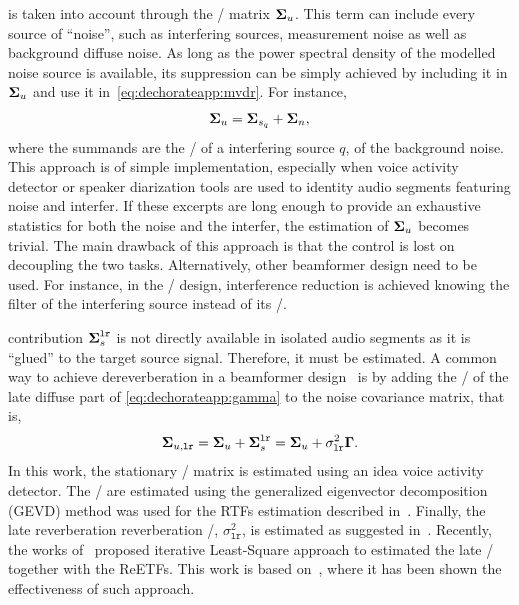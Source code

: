  is taken into account through the \xPSD/ matrix $\boldsymbol{\Sigma}_u$.
This term can include every source of ``noise'', such as interfering sources, measurement noise as well as background diffuse noise.
As long as the power spectral density of the modelled noise source is available, its suppression can be simply achieved by including it in $\boldsymbol{\Sigma}_u$ and use it in~\cref{eq:dechorateapp:mvdr}.
For instance,
\begin{equation}
    \boldsymbol{\Sigma}_u = \boldsymbol{\Sigma}_{s_q} + \boldsymbol{\Sigma}_{n}
    ,
\end{equation}
where the summands are the \xPSD/ of a interfering source $q$, of the background noise.
\\This approach is of simple implementation, especially when voice activity detector or speaker diarization tools are used to identity audio segments featuring noise and interfer.
If these excerpts are long enough to provide an exhaustive statistics for both the noise and the interfer, the estimation of $\boldsymbol{\Sigma}_u$ becomes trivial.
The main drawback of this approach is that the control is lost on decoupling the two tasks.
Alternatively, other beamformer design need to be used. For instance, in the \LCMVtxt/ design, interference reduction is achieved knowing the filter of the interfering source instead of its \xPSD/.

 contribution $\boldsymbol{\Sigma}_{s}^{\mathtt{lr}}$ is not directly available in isolated audio segments as it is ``glued'' to the target source signal.
Therefore, it must be estimated.
A common way to achieve dereverberation in a beamformer design~ is by adding
the \xPSD/ of the late diffuse part of \cref{eq:dechorateapp:gamma} to the noise covariance matrix, that is,
\begin{equation}
    \boldsymbol{\Sigma}_{u,\mathtt{lr}} =  \boldsymbol{\Sigma}_{u} + \boldsymbol{\Sigma}_{s}^{\mathtt{lr}} =  \boldsymbol{\Sigma}_{u} + \sigma_{\mathtt{lr}}^2\mathbf{\Gamma}
    .
\end{equation}
In this work, the stationary \xPSD/ matrix is estimated using an idea voice activity detector.
The \ReTF/ are estimated using the generalized eigenvector decomposition (GEVD) method was used for the RTFs estimation described in~.
Finally, the late reverberation reverberation \xPSD/, $\sigma_{\mathtt{lr}}^2$, is estimated as suggested in~.
Recently, the works of~ proposed iterative Least-Square approach to estimated the late \xPSD/ together with the \acfp{ReETF}.
This work is based on~, where it has been shown the effectiveness of such approach.

